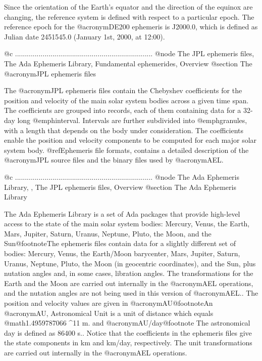 Since the orientation of the Earth's equator and the direction of the
equinox are changing, the reference system is defined with respect to
a particular epoch.  The reference epoch for the @acronym{DE200}
ephemeris is J2000.0, which is defined as Julian date 2451545.0
(January 1st, 2000, at 12:00).

@c ......................................................................
@node The JPL ephemeris files, The Ada Ephemeris Library, Fundamental ephemerides, Overview
@section The @acronym{JPL} ephemeris files

The @acronym{JPL} ephemeris files contain the Chebyshev coefficients
for the position and velocity of the main solar system bodies across a
given time span. The coefficients are grouped into records, each of
them containing data for a 32-day long @emph{interval}. Intervals are
further subdivided into @emph{granules}, with a length that depends on
the body under consideration. The coefficients enable the position and
velocity components to be computed for each major solar system
body. @ref{Ephemeris file formats}, contains a detailed description of
the @acronym{JPL} source files and the binary files used by
@acronym{AEL}.

@c ......................................................................
@node The Ada Ephemeris Library,  , The JPL ephemeris files, Overview
@section The Ada Ephemeris Library

The Ada Ephemeris Library is a set of Ada packages that provide
high-level access to the state of the main solar system bodies:
Mercury, Venus, the Earth, Mars, Jupiter, Saturn, Uranus, Neptune,
Pluto, the Moon, and the Sun@footnote{The ephemeris files contain data
for a slightly different set of bodies: Mercury, Venus, the Earth/Moon
barycenter, Mars, Jupiter, Saturn, Uranus, Neptune, Pluto, the Moon
(in geocentric coordinates), and the Sun, plus nutation angles and, in
some cases, libration angles. The transformations for the Earth and
the Moon are carried out internally in the @acronym{AEL} operations,
and the nutation angles are not being used in this version of
@acronym{AEL}.}. The position and velocity values are given in
@acronym{AU}@footnote{An @acronym{AU, Astronomical Unit} is a unit of
distance which equals @math{1.4959787066 ^{11}} m.} and
@acronym{AU}/day@footnote{ The astronomical day is defined as 86400
s.}. Notice that the coefficients in the ephemeris files give the
state components in km and km/day, respectively. The unit
transformations are carried out internally in the @acronym{AEL}
operations.

